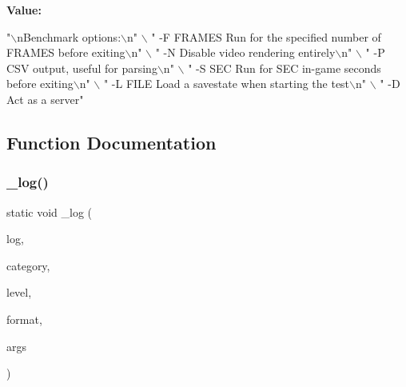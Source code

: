 {\bfseries Value\+:}
\begin{DoxyCode}
\textcolor{stringliteral}{"\(\backslash\)nBenchmark options:\(\backslash\)n"} \(\backslash\)
    \textcolor{stringliteral}{"  -F FRAMES        Run for the specified number of FRAMES before exiting\(\backslash\)n"} \(\backslash\)
    \textcolor{stringliteral}{"  -N               Disable video rendering entirely\(\backslash\)n"} \(\backslash\)
    \textcolor{stringliteral}{"  -P               CSV output, useful for parsing\(\backslash\)n"} \(\backslash\)
    \textcolor{stringliteral}{"  -S SEC           Run for SEC in-game seconds before exiting\(\backslash\)n"} \(\backslash\)
    \textcolor{stringliteral}{"  -L FILE          Load a savestate when starting the test\(\backslash\)n"} \(\backslash\)
    \textcolor{stringliteral}{"  -D               Act as a server"}
\end{DoxyCode}


\subsection{Function Documentation}
\mbox{\label{perf-main_8c_ab638d8a3b5157696f6a07239141bcd51}} 
\subsubsection{\texorpdfstring{\+\_\+log()}{\_log()}}
{\footnotesize\ttfamily static void \+\_\+log (\begin{DoxyParamCaption}\item[{struct m\+Logger $\ast$}]{log,  }\item[{\mbox{\hyperlink{ioapi_8h_a787fa3cf048117ba7123753c1e74fcd6}{int}}}]{category,  }\item[{enum m\+Log\+Level}]{level,  }\item[{const char $\ast$}]{format,  }\item[{\mbox{\hyperlink{__builder_8h_a2b7adf9b9fd4a58a693dc7cfba5b9006}{va\+\_\+list}}}]{args }\end{DoxyParamCaption})\hspace{0.3cm}{\ttfamily [static]}}


